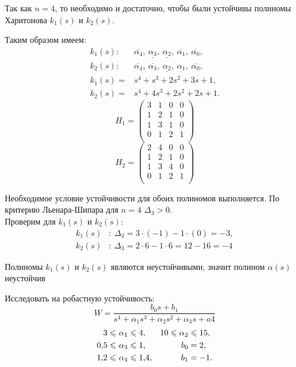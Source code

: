 \documentclass[../../TAU.tex]{subfiles}
\begin{document}
    Так как $n=4$, то необходимо и достаточно, чтобы были устойчивы полиномы Харитонова 
    ${k}_1(s)$ и ${k}_2(s)$.

    Таким образом имеем:
    \begin{align*}
        {k}_1(s):\ &\overline{\alpha_4},\ \underline{\alpha_3},\ \underline{\alpha_2},\ \overline{\alpha_1},\ \overline{\alpha_0},\\
        {k}_2(s):\ &\overline{\alpha_4},\ \overline{\alpha_3},\ \underline{\alpha_2},\ \underline{\alpha_1},\ \overline{\alpha_0},\\
        {k}_1(s)= &s^4+s^3+2s^2+3s+1,\\
        {k}_2(s)= &s^4+4s^3+2s^2+2s+1.
    \end{align*}
    $$
        H_1=
        \begin{pmatrix}
            3 & 1 & 0 & 0 \\
            1 & 2 & 1 & 0 \\
            1 & 3 & 1 & 0 \\
            0 & 1 & 2 & 1 \\
        \end{pmatrix}
    $$
    $$
        H_2=
        \begin{pmatrix}
            2 & 4 & 0 & 0 \\
            1 & 2 & 1 & 0 \\
            1 & 3 & 4 & 0 \\
            0 & 1 & 2 & 1 \\
        \end{pmatrix}
    $$

    Необходимое условие устойчивости для обоих полиномов выполняется. По критерию Льенара-Шипара для $n=4$ $\Delta_3>0$.\\
    Проверим для ${k}_1(s)$ и ${k}_2(s)$:
    \begin{align*}
        {k}_1(s)&:\ \Delta_3=3\cdot(-1)-1\cdot(0)=-3,\\
        {k}_2(s)&:\ \Delta_3=2\cdot6-1\cdot6=12-16=-4
    \end{align*}

    Полиномы ${k}_1(s)$ и ${k}_2(s)$ являются неустойчивыми, значит полином $\alpha(s)$ неустойчив

    \examp Исследовать на робастную устойчивость:
    $$
    W=\frac{b_0s+b_1}{s^4+\alpha_1s^3+\alpha_2s^2+\alpha_3s+a4}
    $$
    \begin{align*}
        3\leqslant\ &\alpha_1\leqslant4, & 10\leqslant \alpha_2&\leqslant15, \\
        0{,}5\leqslant\ &\alpha_3\leqslant1, & b_0&=2, \\
        1{,}2\leqslant\ &\alpha_4\leqslant1{,}4, & b_1&=-1.
    \end{align*}
\end{document}
